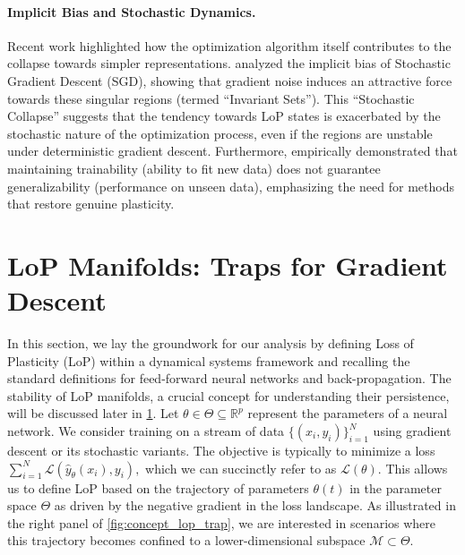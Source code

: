 \documentclass{article}
\newcommand{\Loss}{\mathcal{L}}
\newcommand{\R}{\mathbb{R}}
\numberwithin{figure}{section}
\begin{document}
\vspace{-7pt}
\paragraph{Implicit Bias and Stochastic Dynamics.}
Recent work highlighted how the optimization algorithm itself contributes to the collapse towards simpler representations. \citet{chen2023stochastic} analyzed the implicit bias of Stochastic Gradient Descent (SGD), showing that gradient noise induces an attractive force towards these singular regions (termed ``Invariant Sets''). This ``Stochastic Collapse'' suggests that the tendency towards LoP states is exacerbated by the stochastic nature of the optimization process, even if the regions are unstable under deterministic gradient descent. Furthermore, \citet{wang2024comprehensive} empirically demonstrated that maintaining {trainability} (ability to fit new data) does not guarantee {generalizability} (performance on unseen data), emphasizing the need for methods that restore genuine plasticity.


\section{LoP Manifolds: Traps for Gradient Descent}
\label{sec:existence_lop_manifold}
\label{sec:preliminaries}
In this section, we lay the groundwork for our analysis by defining Loss of Plasticity (LoP) within a dynamical systems framework and recalling the standard definitions for feed-forward neural networks and back-propagation. The stability of LoP manifolds, a crucial concept for understanding their persistence, will be discussed later in \cref{sec:existence_lop_manifold}.
Let $\theta\in\Theta\subseteq\R^p$ represent the parameters of a neural network. We consider training on a stream of data $\{(x_i,y_i)\}_{i=1}^N$ using gradient descent or its stochastic variants. The objective is typically to minimize a loss $\sum_{i=1}^N \Loss(\hat{y}_\theta(x_i),y_i),$ which we can succinctly refer to as $\Loss(\theta)$. This allows us to define LoP based on the  trajectory of parameters $\theta(t)$ in the parameter space $\Theta$ as driven by the negative gradient in the loss landscape. As illustrated in the right panel of \cref{fig:concept_lop_trap}, we are interested in scenarios where this trajectory becomes confined to a lower-dimensional subspace $\mathcal{M} \subset \Theta$.

\end{document}
